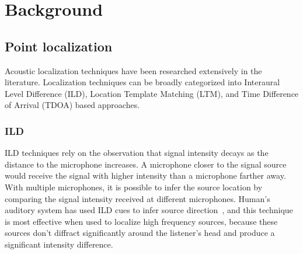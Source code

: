 \chapter{Background}

\section{Point localization}
Acoustic localization techniques have been researched extensively in the literature. Localization techniques can be broadly categorized into Interaural Level Difference (ILD), Location Template Matching (LTM), and Time Difference of Arrival (TDOA) based approaches.

\subsection{ILD}
ILD techniques rely on the observation that signal intensity decays as the distance to the microphone increases. A microphone closer to the signal source would receive the signal with higher intensity than a microphone farther away. With multiple microphones, it is possible to infer the source location by comparing the signal intensity received at different microphones. Human's auditory system has used ILD cues to infer source direction~\cite{ild:2}, and this technique is most effective when used to localize high frequency sources, because these sources don't diffract significantly around the listener's head and produce a significant intensity difference.


